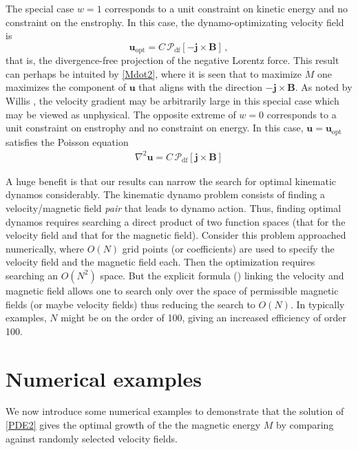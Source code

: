 \documentclass[onecolumn,showpacs,preprintnumbers,amsmath,amssymb]{revtex4-2}
\newcommand{\vsp}[1]{\vspace{#1 pc} \noindent}
\newcommand{\bvec}[1]{{\mathbf{#1}}}
\newcommand{\grad}{\nabla}
\newcommand{\uu}{\bvec{u}}
\newcommand{\uopt}{\uu_{\text{opt}}}
\newcommand{\Bvec}{\bvec{B}}
\newcommand{\jvec}{\bvec{j}}
\newcommand{\weight}{w}
\newcommand{\proj}{ \mathcal{P}_{\text{df}} }
\begin{document}
The special case $\weight=1$ corresponds to a unit constraint on kinetic energy and no constraint on the enstrophy. In this case, the dynamo-optimizating velocity field is 
\begin{equation}
\uopt = C \, \proj \left[ - \jvec \times \Bvec \right] \, ,
\end{equation}
that is, the divergence-free projection of the negative Lorentz force. This result can perhaps be intuited by \cref{Mdot2}, where it is seen that to maximize $\dot{M}$ one maximizes the component of $\uu$ that aligns with the direction $- \jvec \times \Bvec$. As noted by Willis \cite{Willis2012}, the velocity gradient may be arbitrarily large in this special case which may be viewed as unphysical.
%
The opposite extreme of $\weight = 0$ corresponds to a unit constraint on enstrophy and no constraint on energy. In this case, $\uu = \uopt$ satisfies the Poisson equation
\begin{align}
\grad^2 \uu = C \, \proj \left[ \jvec \times \Bvec \right]
\end{align}


\vsp{5}

A huge benefit is that our results can narrow the search for optimal kinematic dynamos considerably. The kinematic dynamo problem consists of finding a velocity/magnetic field {\em pair} that leads to dynamo action. Thus, finding optimal dynamos requires searching a direct product of two function spaces (that for the velocity field and that for the magnetic field). Consider this problem approached numerically, where $O(N)$ grid points (or coefficients) are used to specify the velocity field and the magnetic field each. Then the optimization requires searching an $O(N^2)$ space. But the explicit formula () linking the velocity and magnetic field allows one to search only over the space of permissible magnetic fields (or maybe velocity fields) thus reducing the search to $O(N)$. In typically examples, $N$ might be on the order of 100, giving an increased efficiency of order 100.

\vsp{5}


\section{Numerical examples}

We now introduce some numerical examples to demonstrate that the solution of \cref{PDE2} gives the optimal growth of the the magnetic energy $M$ by comparing against randomly selected velocity fields.
\end{document}
